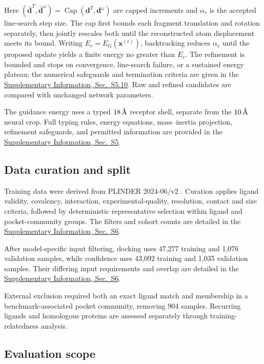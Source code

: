 \documentclass{article}
\newcommand{\angstrom}{\text{\normalfont\AA}}
\newcommand{\citep}[1]{\cite{#1}}
\newcommand{\sisection}[1]{\href{SI.pdf}{Supplementary Information, Sec.~#1}}
\begin{document}
Here \((\bar{\mathbf d}^T,\bar{\mathbf d}^\omega)=\operatorname{Cap}(\mathbf d^T,\mathbf d^\omega)\) are capped increments and \(\alpha_r\) is the accepted line-search step size. The cap first bounds each fragment translation and rotation separately, then jointly rescales both until the reconstructed atom displacement meets its bound.  Writing \(E_r=E_{\mathrm G}(\mathbf{x}^{(r)})\), backtracking reduces \(\alpha_r\) until the proposed update yields a finite energy no greater than \(E_r\).
The refinement is bounded and stops on convergence, line-search failure, or a sustained energy plateau; the numerical safeguards and termination criteria are given in the \sisection{S5.10}.
Raw and refined candidates are compared with unchanged network parameters.

The guidance energy uses a typed \(18\,\angstrom\) receptor shell, separate from the \(10\,\angstrom\) neural crop.
Full typing rules, energy equations, mass--inertia projection, refinement safeguards, and permitted information are provided in the \sisection{S5}.

\label{sec:experiments}

\subsection{Data curation and split}
\label{sec:data_curation}
\label{sec:split_boundary}

Training data were derived from PLINDER 2024-06/v2 \citep{durairaj2024plinder}. Curation applies ligand validity, covalency, interaction, experimental-quality, resolution, contact and size criteria, followed by deterministic representative selection within ligand and pocket-community groups. The filters and cohort counts are detailed in the \sisection{S6}.

After model-specific input filtering, docking uses 47,277 training and 1,076 validation samples, while confidence uses 43,092 training and 1,035 validation samples. Their differing input requirements and overlap are detailed in the \sisection{S6}.

External exclusion required both an exact ligand match and membership in a benchmark-associated pocket community, removing 904 samples. Recurring ligands and homologous proteins are assessed separately through training-relatedness analysis.

\subsection{Evaluation scope}
\label{sec:information_boundary}
\end{document}
